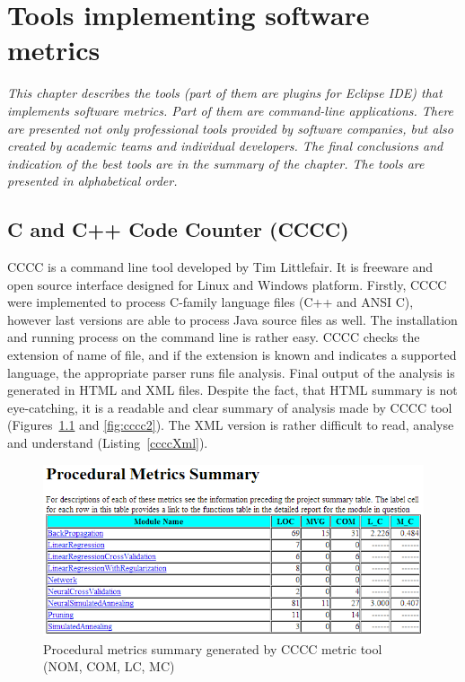 \chapter{Tools implementing software metrics} \label{roz:metrics-tools}

\textit{This chapter describes the tools (part of them are plugins for Eclipse IDE) that implements software metrics. Part of them are command-line applications. There are presented not only professional tools provided by software companies, but also created by academic teams and individual developers. The final conclusions and indication of the best tools are in the summary of the chapter. The tools are presented in alphabetical order.} 

\section{C and C++ Code Counter (CCCC)}
CCCC is a command line tool developed by Tim Littlefair. It is freeware and open source interface designed for Linux and Windows platform. Firstly, CCCC were implemented to process C-family language files (C++ and ANSI C), however last versions are able to process Java source files as well. The installation and running process on the command line is rather easy. CCCC checks the extension of name of file, and if the extension is known and indicates a supported language, the appropriate parser runs file analysis. Final output of the analysis is generated in HTML and XML files. Despite the fact, that HTML summary is not eye-catching, it is a readable and clear summary of analysis made by CCCC tool (Figures~\ref{fig:cccc1} and \ref{fig:cccc2}). The XML version is rather difficult to read, analyse and understand (Listing~\ref{ccccXml}). 

\begin{figure}[h!]
	\centering
	\includegraphics[scale=0.6]{img/cccc1.png} 
	\caption{Procedural metrics summary generated by CCCC metric tool (\ac{NOM}, \ac{COM}, \ac{LC}, \ac{MC})}		
	\label{fig:cccc1}
\end{figure}


